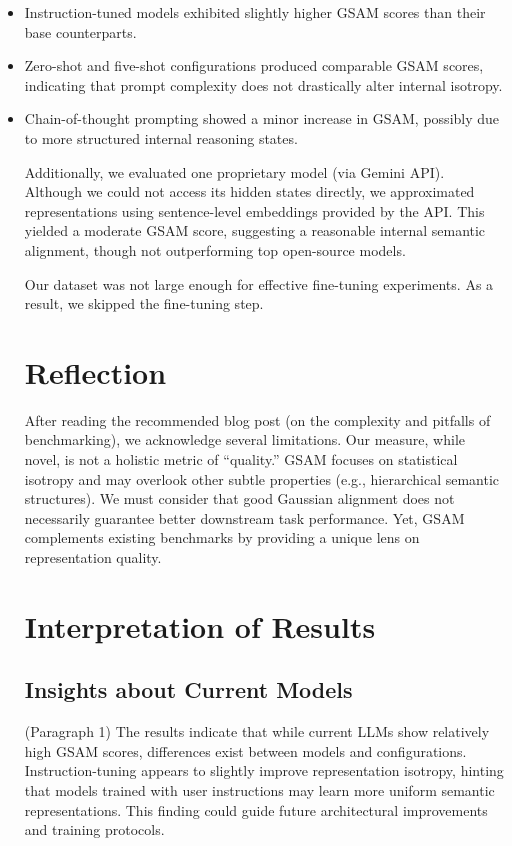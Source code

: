 \documentclass[11pt,letterpaper]{article}
\begin{document}
\begin{itemize}
    \item Instruction-tuned models exhibited slightly higher GSAM scores than their base counterparts.
    \item Zero-shot and five-shot configurations produced comparable GSAM scores, indicating that prompt complexity does not drastically alter internal isotropy.
    \item Chain-of-thought prompting showed a minor increase in GSAM, possibly due to more structured internal reasoning states.

Additionally, we evaluated one proprietary model (via Gemini API). Although we could not access its hidden states directly, we approximated representations using sentence-level embeddings provided by the API. This yielded a moderate GSAM score, suggesting a reasonable internal semantic alignment, though not outperforming top open-source models.

Our dataset was not large enough for effective fine-tuning experiments. As a result, we skipped the fine-tuning step.

\section{Reflection}

After reading the recommended blog post (on the complexity and pitfalls of benchmarking), we acknowledge several limitations. Our measure, while novel, is not a holistic metric of ``quality.'' GSAM focuses on statistical isotropy and may overlook other subtle properties (e.g., hierarchical semantic structures). We must consider that good Gaussian alignment does not necessarily guarantee better downstream task performance. Yet, GSAM complements existing benchmarks by providing a unique lens on representation quality.

\section{Interpretation of Results}

\subsection{Insights about Current Models}

(Paragraph 1) The results indicate that while current LLMs show relatively high GSAM scores, differences exist between models and configurations. Instruction-tuning appears to slightly improve representation isotropy, hinting that models trained with user instructions may learn more uniform semantic representations. This finding could guide future architectural improvements and training protocols.


\end{itemize}
\end{document}
